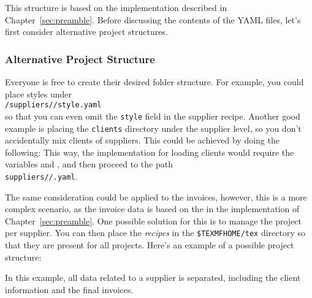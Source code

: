 
This structure is based on the implementation described in Chapter~\ref{sec:preamble}.
Before discussing the contents of the YAML files, let's first consider alternative project structures.

\subsubsection{Alternative Project Structure}
Everyone is free to create their desired folder structure.
For example, you could place styles under\\
\hspace*{4em}\texttt{/suppliers//style.yaml}\\
so that you can even omit the \texttt{style} field in the supplier recipe.
Another good example is placing the \texttt{clients} directory under the supplier level, so you don't accidentally mix clients of suppliers.
This could be achieved by doing the following:
\noindent
This way, the implementation for loading clients would require the variables  and , and then proceed to the path\\
\hspace*{4em}\texttt{suppliers//.yaml}.

The same consideration could be applied to the invoices, however, this is a more complex scenario, as the invoice data is based on the  in the implementation of Chapter~\ref{sec:preamble}.
One possible solution for this is to manage the project per supplier.
You can then place the \textit{recipes} in the \texttt{\$TEXMFHOME/tex} directory so that they are present for all projects.
Here's an example of a possible project structure:\\
\begin{minipage}{.49\linewidth}
\end{minipage}%
\hfill
\begin{minipage}{.49\linewidth}
\end{minipage}
In this example, all data related to a supplier is separated, including the client information and the final invoices.

